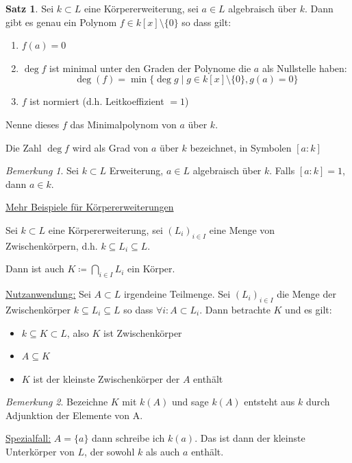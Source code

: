 \documentclass[12pt,parskip=full]{scrartcl}
\newcommand{\heading}{\underline}
\theoremstyle{definition}
\newtheorem{theorem}{Satz}[section]
\theoremstyle{remark}
\newtheorem*{remark}{Bemerkung}
\begin{document}
	\begin{theorem}
		Sei $k \subset L$ eine Körpererweiterung, sei $a \in L$ algebraisch über $k$. Dann gibt es genau ein Polynom $f \in k[x] \setminus \{ 0 \}$ so dass gilt:
		\begin{enumerate}
			\item $f(a) = 0$
			\item $\deg f$ ist minimal unter den Graden der Polynome die $a$ als Nullstelle haben:
			\begin{equation*}
				\deg (f) = \min \{ \deg g \mid g \in k[x] \setminus \{0 \}, g(a) = 0 \}
			\end{equation*}
			\item $f$ ist normiert (d.h. Leitkoeffizient $= 1$)
		\end{enumerate}
		Nenne dieses $f$ das Minimalpolynom von $a$ über $k$.
		
		Die Zahl $\deg f$ wird als Grad von $a$ über $k$ bezeichnet, in Symbolen $[a: k]$
	\end{theorem}

	\begin{remark}
		Sei $k \subset L$ Erweiterung, $a \in L$ algebraisch über $k$. Falls $[a:k] = 1$, dann $a \in k$.
	\end{remark}

	\heading{Mehr Beispiele für Körpererweiterungen}
	
	Sei $k \subset L$ eine Körpererweiterung, sei $(L_i)_{i \in I}$ eine Menge von Zwischenkörpern, d.h. $k \subseteq L_i \subseteq L$.
	
	Dann ist auch $K \coloneqq \bigcap_{i \in I} L_i$ ein Körper.
	
	\heading{Nutzanwendung:} Sei $A \subset L$ irgendeine Teilmenge. Sei $(L_i)_{i \in I}$ die Menge der Zwischenkörper $k \subseteq L_i \subseteq L$ so dass $\forall i: A \subset L_i$. Dann betrachte $K$ und es gilt:
	\begin{itemize}
		\item $k \subseteq K \subset L$, also $K$ ist Zwischenkörper
		\item $A \subseteq K$
		\item $K$ ist der kleinste Zwischenkörper der $A$ enthält
	\end{itemize}

	\begin{remark}
		Bezeichne $K$ mit $k(A)$ und sage $k(A)$ entsteht aus $k$ durch Adjunktion der Elemente von A.
	\end{remark}

	\heading{Spezialfall:} $A = \{ a \}$ dann schreibe ich $k(a)$. Das ist dann der kleinste Unterkörper von $L$, der sowohl $k$ als auch $a$ enthält.
	
\end{document}
